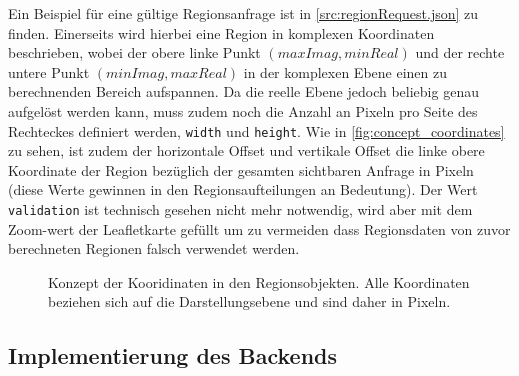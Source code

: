 
Ein Beispiel für eine gültige Regionsanfrage ist in \autoref{src:regionRequest.json} zu finden.
Einerseits wird hierbei eine Region in komplexen Koordinaten beschrieben, wobei der obere linke Punkt $(maxImag, minReal)$
und der rechte untere Punkt $(minImag, maxReal)$ in der komplexen Ebene einen zu berechnenden Bereich aufspannen.
Da die reelle Ebene jedoch beliebig genau aufgelöst werden kann, muss zudem noch die Anzahl an Pixeln
pro Seite des Rechteckes definiert werden, \verb|width| und \verb|height|.
Wie in \autoref{fig:concept_coordinates} zu sehen, ist zudem der horizontale Offset und vertikale Offset
die linke obere Koordinate der Region bezüglich der gesamten sichtbaren Anfrage in Pixeln (diese Werte
gewinnen in den Regionsaufteilungen an Bedeutung).
Der Wert \verb|validation| ist technisch gesehen nicht mehr notwendig, wird aber mit dem Zoom-wert der Leafletkarte gefüllt
um zu vermeiden dass Regionsdaten von zuvor berechneten Regionen falsch verwendet werden.

\begin{figure}
	
\end{figure}
\begin{figure}
	\caption{Konzept der Kooridinaten in den Regionsobjekten. Alle Koordinaten beziehen sich auf die Darstellungsebene und sind daher in Pixeln.}
	\label{fig:concept_coordinates}
\end{figure}


\subsection{Implementierung des Backends}

